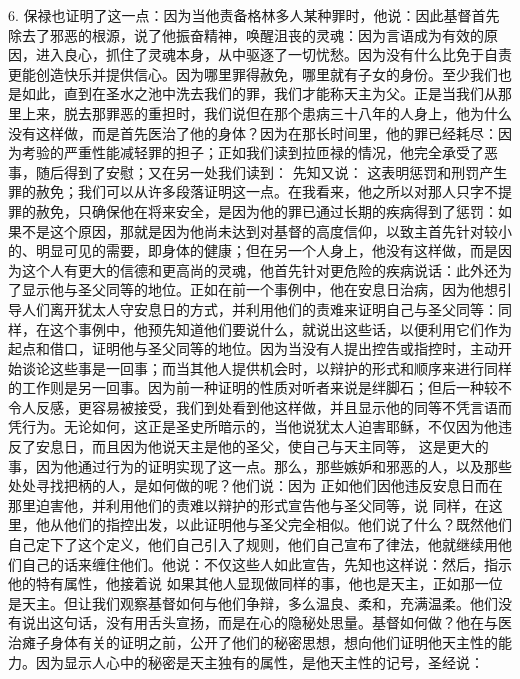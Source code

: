6. 保禄也证明了这一点：因为当他责备格林多人某种罪时，他说：因此基督首先除去了邪恶的根源，说了他振奋精神，唤醒沮丧的灵魂：因为言语成为有效的原因，进入良心，抓住了灵魂本身，从中驱逐了一切忧愁。因为没有什么比免于自责更能创造快乐并提供信心。因为哪里罪得赦免，哪里就有子女的身份。至少我们也是如此，直到在圣水之池中洗去我们的罪，我们才能称天主为父。正是当我们从那里上来，脱去那罪恶的重担时，我们说但在那个患病三十八年的人身上，他为什么没有这样做，而是首先医治了他的身体？因为在那长时间里，他的罪已经耗尽：因为考验的严重性能减轻罪的担子；正如我们读到拉匝禄的情况，他完全承受了恶事，随后得到了安慰；又在另一处我们读到： 先知又说： 这表明惩罚和刑罚产生罪的赦免；我们可以从许多段落证明这一点。在我看来，他之所以对那人只字不提罪的赦免，只确保他在将来安全，是因为他的罪已通过长期的疾病得到了惩罚：如果不是这个原因，那就是因为他尚未达到对基督的高度信仰，以致主首先针对较小的、明显可见的需要，即身体的健康；但在另一个人身上，他没有这样做，而是因为这个人有更大的信德和更高尚的灵魂，他首先针对更危险的疾病说话：此外还为了显示他与圣父同等的地位。正如在前一个事例中，他在安息日治病，因为他想引导人们离开犹太人守安息日的方式，并利用他们的责难来证明自己与圣父同等：同样，在这个事例中，他预先知道他们要说什么，就说出这些话，以便利用它们作为起点和借口，证明他与圣父同等的地位。因为当没有人提出控告或指控时，主动开始谈论这些事是一回事；而当其他人提供机会时，以辩护的形式和顺序来进行同样的工作则是另一回事。因为前一种证明的性质对听者来说是绊脚石；但后一种较不令人反感，更容易被接受，我们到处看到他这样做，并且显示他的同等不凭言语而凭行为。无论如何，这正是圣史所暗示的，当他说犹太人迫害耶稣，不仅因为他违反了安息日，而且因为他说天主是他的圣父，使自己与天主同等， 这是更大的事，因为他通过行为的证明实现了这一点。那么，那些嫉妒和邪恶的人，以及那些处处寻找把柄的人，是如何做的呢？他们说：因为 正如他们因他违反安息日而在那里迫害他，并利用他们的责难以辩护的形式宣告他与圣父同等，说 同样，在这里，他从他们的指控出发，以此证明他与圣父完全相似。他们说了什么？既然他们自己定下了这个定义，他们自己引入了规则，他们自己宣布了律法，他就继续用他们自己的话来缠住他们。他说：不仅这些人如此宣告，先知也这样说：然后，指示他的特有属性，他接着说 如果其他人显现做同样的事，他也是天主，正如那一位是天主。但让我们观察基督如何与他们争辩，多么温良、柔和，充满温柔。他们没有说出这句话，没有用舌头宣扬，而是在心的隐秘处思量。基督如何做？他在与医治瘫子身体有关的证明之前，公开了他们的秘密思想，想向他们证明他天主性的能力。因为显示人心中的秘密是天主独有的属性，是他天主性的记号，圣经说： 